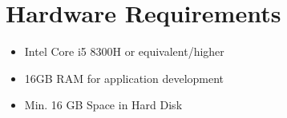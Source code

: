 \documentclass[openany,12pt]{report}
\begin{document}

	\section{Hardware Requirements}
	\begin{itemize}
		\item{Intel Core i5 8300H or equivalent/higher}
		\item{16GB RAM for application development}
		\item{Min. 16 GB Space in Hard Disk}
	\end{itemize}
	
\end{document}
